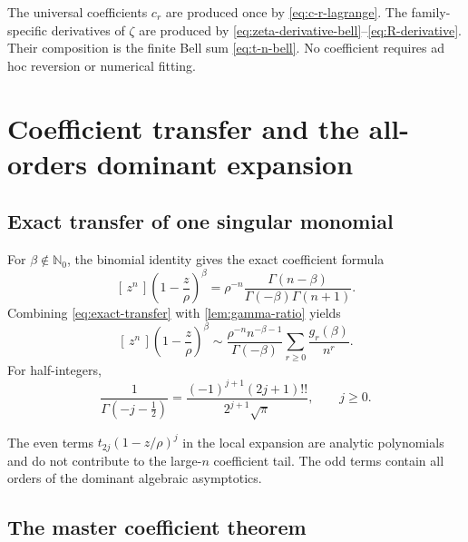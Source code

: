 \documentclass[11pt,oneside]{article}
\numberwithin{equation}{section}
\theoremstyle{plain}
\theoremstyle{definition}
\theoremstyle{remark}
\newcommand{\Nzero}{\mathbb N_0}
\newcommand{\Coeff}[2]{[\,#1^{#2}\,]}
\begin{document}
\begin{summarybox}
The universal coefficients $c_r$ are produced once by
\eqref{eq:c-r-lagrange}.  The family-specific derivatives of $\zeta$ are
produced by \eqref{eq:zeta-derivative-bell}--\eqref{eq:R-derivative}.  Their
composition is the finite Bell sum \eqref{eq:t-n-bell}.  No coefficient
requires ad hoc reversion or numerical fitting.
\end{summarybox}

\section{Coefficient transfer and the all-orders dominant expansion}\label{sec:transfer}

\subsection{Exact transfer of one singular monomial}

For $\beta\notin\Nzero$, the binomial identity gives the exact coefficient
formula
\begin{equation}\label{eq:exact-transfer}
 \Coeff{z}{n}\left(1-\frac z\rho\right)^\beta
 =\rho^{-n}\frac{\Gamma(n-\beta)}{\Gamma(-\beta)\Gamma(n+1)}.
\end{equation}
Combining \eqref{eq:exact-transfer} with \cref{lem:gamma-ratio} yields
\begin{equation}\label{eq:monomial-transfer-full}
 \Coeff{z}{n}\left(1-\frac z\rho\right)^\beta
 \sim\frac{\rho^{-n}n^{-\beta-1}}{\Gamma(-\beta)}
 \sum_{r\ge0}\frac{g_r(\beta)}{n^r}.
\end{equation}
For half-integers,
\begin{equation}\label{eq:half-gamma}
 \frac{1}{\Gamma(-j-\tfrac12)}
 =\frac{(-1)^{j+1}(2j+1)!!}{2^{j+1}\sqrt\pi},
 \qquad j\ge0.
\end{equation}

The even terms $t_{2j}(1-z/\rho)^j$ in the local expansion are analytic
polynomials and do not contribute to the large-$n$ coefficient tail.  The
odd terms contain all orders of the dominant algebraic asymptotics.

\subsection{The master coefficient theorem}
\end{document}
